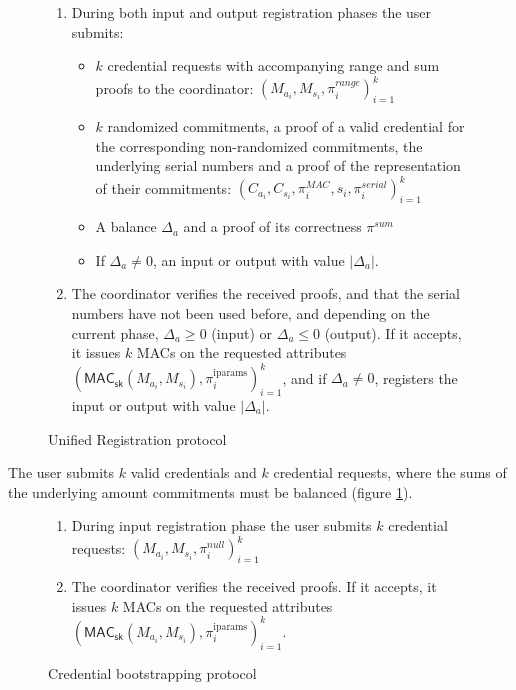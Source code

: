 \documentclass{article}
\begin{document}
\begin{figure}[h!]
    \begin{mdframed}
    \begin{enumerate}
        \item During both input and output registration phases the user submits:
        \begin{itemize}
            \item $k$ credential requests with accompanying range and sum proofs to the coordinator:  $(M_{a_i},M_{s_i},\pi^{\textit{range}}_{i})^{k}_{i=1}$
            \item $k$ randomized commitments, a proof of a valid credential for the corresponding non-randomized commitments, the underlying serial numbers and a proof of the representation of their commitments: $(C_{a_i},C_{s_i},\pi_{i}^{\mathit{MAC}},s_i,\pi_i^{\textit{serial}})^{k}_{i=1}$
            \item A balance $\Delta_{a}$ and a proof of its correctness $\pi^{\textit{sum}}$
            \item If $\Delta_{a} \ne 0$, an input or output with value $|\Delta_{a}|$.
        \end{itemize}
        \item The coordinator verifies the received proofs, and that the serial numbers have not been used before, and depending on the current phase, $\Delta_{a} \geq 0$ (input) or $\Delta_{a} \leq 0$ (output). If it accepts, it issues $k$ MACs on the requested attributes $(\mathsf{MAC}_\mathsf{sk}(M_{a_i},M_{s_i}), \pi_i^{\mathrm{iparams}})^{k}_{i=1}$, and if $\Delta_{a} \ne 0$, registers the input or output with value $|\Delta_{a}|$.
    \end{enumerate}
    \end{mdframed}
    \caption{Unified Registration protocol}
    \label{fig:reissue}
\end{figure}

The user submits $k$ valid credentials and $k$ credential requests, where the sums of the underlying amount commitments must be balanced (figure \ref{fig:reissue}).

\begin{figure}[h!]
  \begin{mdframed}
    \begin{enumerate}
    \item During input registration phase the user submits $k$ credential requests:  $(M_{a_i},M_{s_i},\pi^{\mathit{null}}_{i})^{k}_{i=1}$
    \item The coordinator verifies the received proofs. If it accepts, it issues $k$ MACs on the requested attributes $(\mathsf{MAC}_\mathsf{sk}(M_{a_i},M_{s_i}), \pi_i^{\mathrm{iparams}})^{k}_{i=1}$.
    \end{enumerate}
  \end{mdframed}
  \caption{Credential bootstrapping protocol}
  \label{fig:bootstrap}
\end{figure}
\end{document}
